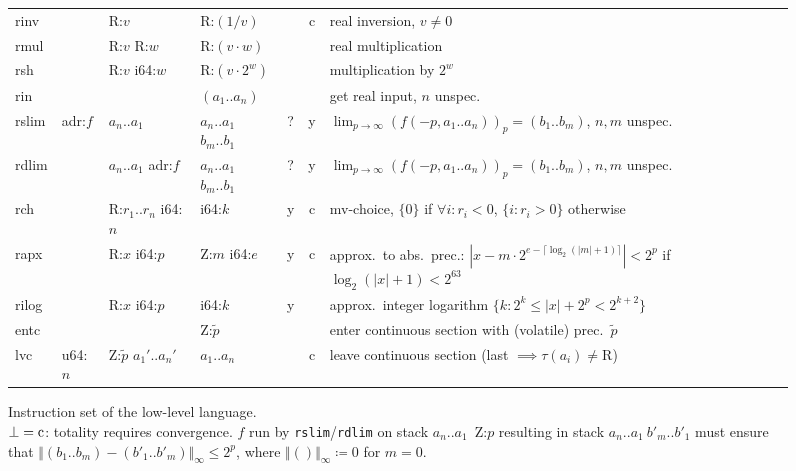 \documentclass[a4paper,parskip=half]{scrartcl}
\begin{document}
\begin{figure}[h]
\begin{tabular}{l|l|l|l@{\;\,\vline\,}c@{\,\vline\,}c@{\,\vline\;\,}p{9cm}}
  \ttfamily rinv  &         & R:$v$           & R:$(1/v)$       & &c& real inversion, $v\neq0$ \\
  \ttfamily rmul  &         & R:$v$ R:$w$     & R:$(v\cdot w)$  & && real multiplication \\
  \ttfamily rsh   &         & R:$v$ i64:$w$   & R:$(v\cdot2^w)$ & && multiplication by $2^w$ \\
  \ttfamily rin   &         &                 & $(a_1..a_n)$    & && get real input, $n$ unspec. \\
  \hline
  \ttfamily rslim & adr:$f$ & $a_n..a_1$ & $a_n..a_1$ $b_m..b_1$ &?&y& $\lim_{p\to\infty}{(f(-p,a_1..a_n))_p} = (b_1..b_m)$, $n,m$ unspec. \\%
  \ttfamily rdlim &         & $a_n..a_1$ adr:$f$ & $a_n..a_1$ $b_m..b_1$ &?&y& $\lim_{p\to\infty}{(f(-p,a_1..a_n))_p} = (b_1..b_m)$, $n,m$ unspec. \\%
  \ttfamily rch   &         & R:$r_1..r_n$ i64:$n$ & i64:$k$    &y&c& mv-choice, $\{0\}$ if $\forall i:r_i<0$, $\{i:r_i>0\}$ otherwise \\
  \ttfamily rapx  &         & R:$x$ i64:$p$   & Z:$m$ i64:$e$   &y&c& approx.\ to abs.\ prec.: $|x-m\cdot2^{e-\lceil\log_2(|m|+1)\rceil}|<2^p$ if $\log_2(|x|+1)<2^{63}$ \\
  \ttfamily rilog &         & R:$x$ i64:$p$   & i64:$k$         &y&& approx.\ integer logarithm $\{k:2^k\leq|x|+2^p<2^{k+2}\}$ \\[-1.35ex]\hline\noalign{\vspace{\dimexpr 1.35ex-.5pt}}
  \hline
  \ttfamily entc  &         &                           & Z:$\tilde p$ && & enter continuous section with (volatile) prec.\ $\tilde p$ \\
  \ttfamily lvc   & u64:$n$ & Z:$\tilde p$ $a_1'..a_n'$ & $a_1..a_n$   &&c& leave continuous section (last $\implies\tau(a_i)\neq\text{R}$)
\end{tabular}
\caption{Instruction set of the low-level language. \\
	$\bot=\text c$: totality requires convergence.
	$f$ run by \texttt{rslim}/\texttt{rdlim} on stack $a_n..a_1$~Z:$p$ resulting
	in stack $a_n..a_1~b'_m..b'_1$ must ensure that $\Vert(b_1..b_m)-(b'_1..b'_m)\Vert_\infty\leq2^p$,
	where $\Vert()\Vert_\infty\coloneqq0$ for $m=0$.}
\label{fig:instrs}
\end{figure}
\end{document}
